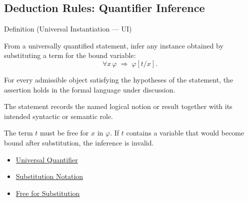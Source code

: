 
\subsection{Deduction Rules: Quantifier Inference}


\begin{definitionbox}{Definition (Universal Instantiation --- UI)}
\begin{definition}\label{def:ui}
From a universally quantified statement, infer any instance obtained by
substituting a term for the bound variable:
\[
\forall x\,\varphi \;\Rightarrow\; \varphi[t/x].
\]
\end{definition}
\end{definitionbox}
\begin{remark*}
For every admissible object satisfying the hypotheses of the statement, the
assertion holds in the formal language under discussion.
\end{remark*}

\begin{remark*}[Interpretation]
The statement records the named logical notion or result together with its
intended syntactic or semantic role.
\end{remark*}


\begin{remark*}[Exposition]
The term $t$ must be free for $x$ in $\varphi$. If $t$ contains a variable
that would become bound after substitution, the inference is invalid.
\end{remark*}

\begin{dependencies}
\begin{itemize}
  \item \hyperref[def:universal-q]{Universal Quantifier}
  \item \hyperref[def:subst-notation]{Substitution Notation}
  \item \hyperref[def:free-for]{Free for Substitution}
\end{itemize}
\end{dependencies}

